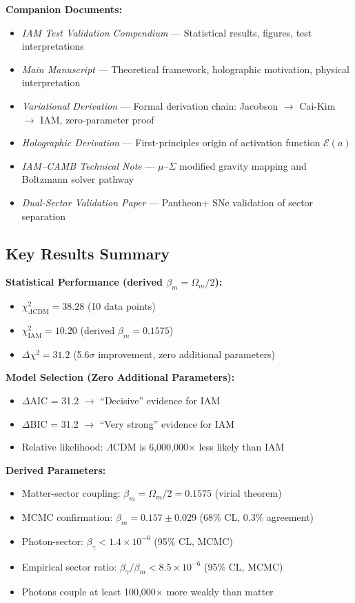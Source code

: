 \documentclass[11pt]{article}
\begin{document}
\noindent\textbf{Companion Documents:}
\begin{itemize}
    \item \textit{IAM Test Validation Compendium} --- Statistical results, figures, test interpretations
    \item \textit{Main Manuscript} --- Theoretical framework, holographic motivation, physical interpretation
    \item \textit{Variational Derivation} --- Formal derivation chain: Jacobson $\to$ Cai-Kim $\to$ IAM, zero-parameter proof
    \item \textit{Holographic Derivation} --- First-principles origin of activation function $\mathcal{E}(a)$
    \item \textit{IAM--CAMB Technical Note} --- $\mu$--$\Sigma$ modified gravity mapping and Boltzmann solver pathway
    \item \textit{Dual-Sector Validation Paper} --- Pantheon+ SNe validation of sector separation
\end{itemize}

\subsection{Key Results Summary}

\textbf{Statistical Performance (derived $\beta_m = \Omega_m/2$):}
\begin{itemize}
    \item $\chi^2_{\Lambda\text{CDM}} = 38.28$ (10 data points)
    \item $\chi^2_{\text{IAM}} = 10.20$ (derived $\beta_m = 0.1575$)
    \item $\Delta\chi^2 = 31.2$ (5.6$\sigma$ improvement, zero additional parameters)
\end{itemize}

\textbf{Model Selection (Zero Additional Parameters):}
\begin{itemize}
    \item $\Delta$AIC = 31.2 $\rightarrow$ ``Decisive'' evidence for IAM
    \item $\Delta$BIC = 31.2 $\rightarrow$ ``Very strong'' evidence for IAM
    \item Relative likelihood: $\Lambda$CDM is 6,000,000$\times$ less likely than IAM
\end{itemize}

\textbf{Derived Parameters:}
\begin{itemize}
    \item Matter-sector coupling: $\beta_m = \Omega_m/2 = 0.1575$ (virial theorem)
    \item MCMC confirmation: $\beta_m = 0.157 \pm 0.029$ (68\% CL, 0.3\% agreement)
    \item Photon-sector: $\beta_\gamma < 1.4 \times 10^{-6}$ (95\% CL, MCMC)
    \item Empirical sector ratio: $\beta_\gamma/\beta_m < 8.5 \times 10^{-6}$ (95\% CL, MCMC)
    \item Photons couple at least 100,000$\times$ more weakly than matter
\end{itemize}
\end{document}
